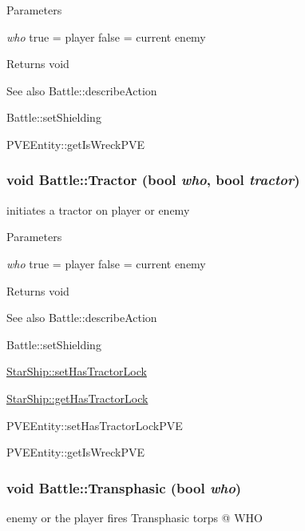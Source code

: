 \begin{DoxyParams}{Parameters}
\item[{\em who}]true = player false = current enemy\end{DoxyParams}
\begin{DoxyReturn}{Returns}
void
\end{DoxyReturn}
\begin{DoxySeeAlso}{See also}
Battle::describeAction 

Battle::setShielding

PVEEntity::getIsWreckPVE 
\end{DoxySeeAlso}
\hypertarget{classBattle_a36916b73287143368e13759da9a64842}{
\subsubsection[{Tractor}]{\setlength{\rightskip}{0pt plus 5cm}void Battle::Tractor (bool {\em who}, \/  bool {\em tractor})}}
\label{dd/dfd/classBattle_a36916b73287143368e13759da9a64842}
initiates a tractor on player or enemy


\begin{DoxyParams}{Parameters}
\item[{\em who}]true = player false = current enemy\end{DoxyParams}
\begin{DoxyReturn}{Returns}
void
\end{DoxyReturn}
\begin{DoxySeeAlso}{See also}
Battle::describeAction 

Battle::setShielding

\hyperlink{classStarShip_a44bc85e4cbd29a883d1068a08ab6b4b4}{StarShip::setHasTractorLock} 

\hyperlink{classStarShip_af072da551eff3b24cce85dd5f33efba3}{StarShip::getHasTractorLock}

PVEEntity::setHasTractorLockPVE 

PVEEntity::getIsWreckPVE 
\end{DoxySeeAlso}
\hypertarget{classBattle_a291ea216c6a4a576c9cd287ddf5afb89}{
\subsubsection[{Transphasic}]{\setlength{\rightskip}{0pt plus 5cm}void Battle::Transphasic (bool {\em who})}}
\label{dd/dfd/classBattle_a291ea216c6a4a576c9cd287ddf5afb89}
enemy or the player fires Transphasic torps @ WHO


